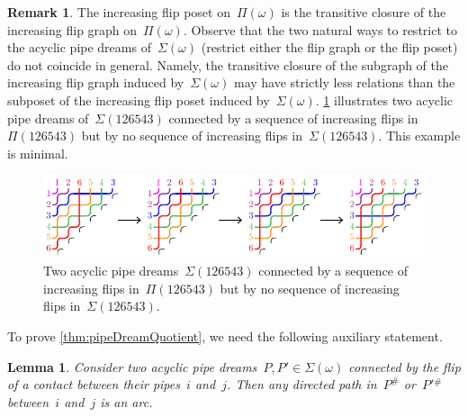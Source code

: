 \documentclass{amsart}
\newtheorem{lemma}[theorem]{Lemma}
\theoremstyle{definition}
\newtheorem{remark}[theorem]{Remark}
\newcommand{\pipeDreams}{\Pi} %
\newcommand{\contact}{^\#} %
\newcommand{\acyclicPipeDreams}{\Sigma} %
\begin{document}
\begin{remark}
\label{rem:pipeDreamQuotient}
The increasing flip poset on~$\pipeDreams(\omega)$ is the transitive closure of the increasing flip graph on~$\pipeDreams(\omega)$.
Observe that the two natural ways to restrict to the acyclic pipe dreams of~$\acyclicPipeDreams(\omega)$ (restrict either the flip graph or the flip poset) do not coincide in general.
Namely, the transitive closure of the subgraph of the increasing flip graph induced by~$\acyclicPipeDreams(\omega)$ may have strictly less relations than the subposet of the increasing flip poset induced by~$\acyclicPipeDreams(\omega)$.
\cref{fig:counterExampleRestrictionIncreasingFlipPoset} illustrates two acyclic pipe dreams of~$\acyclicPipeDreams(126543)$ connected by a sequence of increasing flips in~$\pipeDreams(126543)$ but by no sequence of increasing flips in~$\acyclicPipeDreams(126543)$.
This example is minimal.

\begin{figure}[ht]
	\centerline{\includegraphics[scale=1.3]{counterExampleRestrictionIncreasingFlipPoset}}
	\caption{Two acyclic pipe dreams~$\acyclicPipeDreams(126543)$ connected by a sequence of increasing flips in~$\pipeDreams(126543)$ but by no sequence of increasing flips in~$\acyclicPipeDreams(126543)$.}
	\label{fig:counterExampleRestrictionIncreasingFlipPoset}
\end{figure}
\end{remark}

To prove \cref{thm:pipeDreamQuotient}, we need the following auxiliary statement.

\begin{lemma}
\label{lem:flippable}
Consider two acyclic pipe dreams~$P,P' \in \acyclicPipeDreams(\omega)$ connected by the flip of a contact between their pipes~$i$ and~$j$.
Then any directed path in~$P\contact$ or~$P'{}\contact$ between~$i$ and~$j$ is an arc.
\end{lemma}
\end{document}
